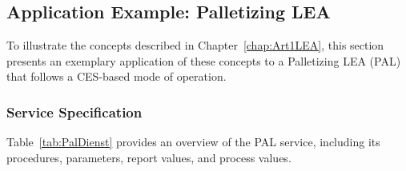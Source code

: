 
\subsection{Application Example: Palletizing LEA}
\label{subsec:PalettierenLea}

To illustrate the concepts described in Chapter~\ref{chap:Art1LEA}, this section presents an exemplary application of these concepts to a Palletizing LEA (PAL) that follows a CES-based mode of operation.

\subsubsection{Service Specification}

Table~\ref{tab:PalDienst} provides an overview of the PAL service, including its procedures, parameters, report values, and process values.

